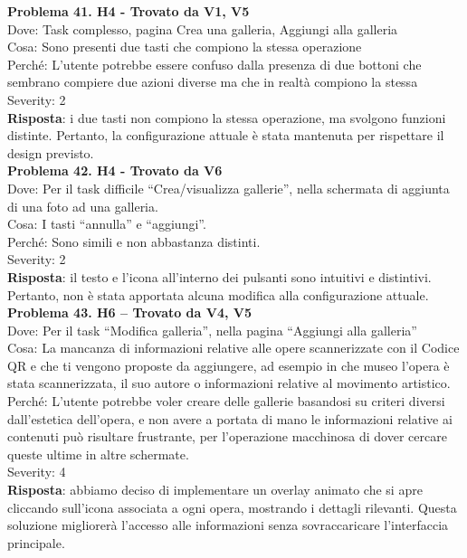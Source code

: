\documentclass{article}
\begin{document}
\noindent \textbf{Problema 41. H4 - Trovato da V1, V5} \\
Dove: Task complesso, pagina Crea una galleria, Aggiungi alla galleria \\
Cosa: Sono presenti due tasti che compiono la stessa operazione \\
Perché: L’utente potrebbe essere confuso dalla presenza di due bottoni che sembrano compiere due azioni diverse ma che in realtà compiono la stessa \\
Severity: 2 \\
\textbf{Risposta}: i due tasti non compiono la stessa operazione, ma svolgono funzioni distinte. Pertanto, la configurazione attuale è stata mantenuta per rispettare il design previsto.\\

\noindent \textbf{Problema 42. H4 - Trovato da V6} \\
Dove: Per il task difficile “Crea/visualizza gallerie”, nella schermata di aggiunta di una foto ad una galleria. \\
Cosa: I tasti “annulla” e “aggiungi”. \\
Perché: Sono simili e non abbastanza distinti. \\
Severity: 2 \\
\textbf{Risposta}: il testo e l’icona all’interno dei pulsanti sono intuitivi e distintivi. Pertanto, non è stata apportata alcuna modifica alla configurazione attuale.\\

\noindent \textbf{Problema 43. H6 – Trovato da V4, V5} \\
Dove: Per il task “Modifica galleria”, nella pagina “Aggiungi alla galleria” \\
Cosa: La mancanza di informazioni relative alle opere scannerizzate con il Codice QR e che ti vengono proposte da aggiungere, ad esempio in che museo l’opera è stata scannerizzata, il suo autore o informazioni relative al movimento artistico. \\
Perché: L’utente potrebbe voler creare delle gallerie basandosi su criteri diversi dall’estetica dell’opera, e non avere a portata di mano le informazioni relative ai contenuti può risultare frustrante, per l’operazione macchinosa di dover cercare queste ultime in altre schermate. \\
Severity: 4 \\
\textbf{Risposta}: abbiamo deciso di implementare un overlay animato che si apre cliccando sull’icona associata a ogni opera, mostrando i dettagli rilevanti. Questa soluzione migliorerà l’accesso alle informazioni senza sovraccaricare l’interfaccia principale.\\
\end{document}
